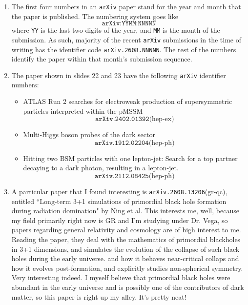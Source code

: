 \documentclass[12pt,a4paper]{article}
\begin{document}
	\begin{solution_pset}
		\begin{enumerate}[label=\textbf{\arabic*.}]
			\item The first four numbers in an \texttt{arXiv} paper stand for the year and 
				  month that the paper is published. The numbering system goes like 
				  \[
					  \texttt{arXiv:YYMM:NNNNN}
				  \]
				  where \texttt{YY} is the last two digits of the year, and \texttt{MM} is
				  the month of the submission. As such, majority of the recent 
				  \texttt{arXiv} submissions in the time of writing has the identifier code
				  \texttt{arXiv.2608.NNNNN}. The rest of the numbers identify the paper 
				  within that month's submission sequence.
			\item The paper shown in slides 22 and 23 have the following \texttt{arXiv} identifier numbers:
				  \begin{itemize}
					  \item ATLAS Run 2 searches for electroweak production of supersymmetric particles interpreted within the pMSSM  
							\[ \texttt{arXiv.2402.01392}\text{(hep-ex)} \]
					  \item	Multi-Higgs boson probes of the dark sector
							\[ \texttt{arXiv.1912.02204}\text{(hep-ph)} \]
					  \item Hitting two BSM particles with one lepton-jet: Search for a top partner decaying to a dark photon, resulting in a lepton-jet.
							\[ \texttt{arXiv.2112.08425}\text{(hep-ph)} \]
				  \end{itemize}
			\item A particular paper that I found interesting is \texttt{arXiv.2608.13206}(gr-qc)\cite{ning2026}, entitled 
				  ``Long-term 3+1 simulations of primordial black hole formation during radiation domination" by Ning et al. This interests
				  me, well, because my field primarily right now is GR and I'm studying under Dr. Vega, so papers regarding 
				  general relativity and cosmology are of high interest to me. Reading the paper, they deal with the 
				  mathematics of primordial blackholes in 3+1 dimensions, and simulates the evolution of the collapse of such black holes during the early universe.
				  and how it behaves near-critical collaps and how it evolves post-formation, and explicitly studies non-spherical
				  symmetry. Very interesting indeed. I myself believe that primordial black holes were abundant in the 
				  early universe and is possibly one of the contributors of dark matter, so this paper is right up my
				  alley. It's pretty neat!
		\end{enumerate}
	\end{solution_pset}
	\newpage
\end{document}
